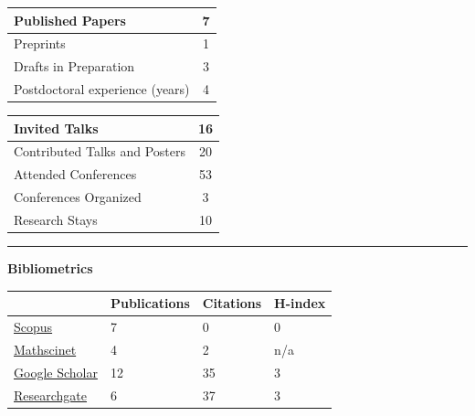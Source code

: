 \documentclass[a4paper]{article}
\newcommand{\block}[1]{\hrule \vspace{0.2cm} \textbf{\Large #1} \vspace{0.2cm}}
\begin{document}
		\begin{minipage}[t]{0.45\columnwidth}
		\center
	\begin{tabularx}{\linewidth}{|X|c|}
	\hline
	
	Published Papers & 7 \\
	\hline
	
	Preprints & 1 \\
	\hline
	
	Drafts in Preparation & 3 \\
	\hline
	
	Postdoctoral experience (years) & 4 \\
	\hline
	
	\end{tabularx}
		\end{minipage} 
		\hfill	
		\begin{minipage}[t]{0.45\columnwidth}
		\center
	\begin{tabularx}{\linewidth}{|X|c|}
	\hline
	
	Invited Talks & 16 \\
	\hline
	
	Contributed Talks and Posters & 20 \\
	\hline
	
	Attended Conferences & 53 \\
	\hline

	Conferences Organized & 3 \\
	\hline	
	Research Stays & 10 \\
	\hline
	
	\end{tabularx}
		\end{minipage} 	
	\vspace{1em}	
	
	\block{Bibliometrics}

	\begin{center}
		\begin{tabularx}{.75\linewidth}{|X|p{7em}|p{7em}|p{7em}|}
				\hline
				 & 
				 Publications & 
				 Citations &
				 H-index 
				 \\
				 \hline 
				 \href{https://www.scopus.com/authid/detail.uri?authorId=57218509273\#tab=preprints}{Scopus} & 7 & 0 &0 
				 \\
				\href{https://mathscinet.ams.org/mathscinet/author?authorId=1435797}{Mathscinet} & 4 & 2 & n/a 
				\\
				\href{https://scholar.google.com/citations?user=DWKPuJYAAAAJ\&hl=it\&oi=ao}{Google Scholar} & 12 & 35 & 3 
				\\
				\href{https://www.researchgate.net/profile/Antonio-Miti}{Researchgate} & 6 & 37 & 3 
				\\
				\hline
		\end{tabularx}
	\end{center}
\end{document}
